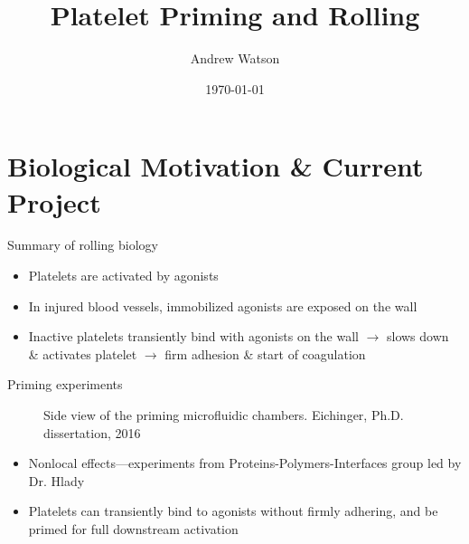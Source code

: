 \documentclass[10pt]{beamer}
\title{Platelet Priming and Rolling}
\date{\today}
\author{Andrew Watson}
\institute{University of Utah}
\begin{document}
\maketitle


\section{Biological Motivation \& Current Project}

\begin{frame}{Summary of rolling biology}
  \begin{itemize}
  \item Platelets are activated by agonists
  \item In injured blood vessels, immobilized agonists are exposed on
    the wall
  \item Inactive platelets transiently bind with agonists on the wall
    $\rightarrow$ slows down \& activates platelet $\rightarrow$ firm
    adhesion \& start of coagulation
  \end{itemize}
\end{frame}

\begin{frame}{Priming experiments}
  \begin{figure}
    \centering
    \setlength{\fboxsep}{0pt}
    \setlength{\fboxrule}{.25pt}
    \caption{Side view of the priming microfluidic
      chambers. Eichinger, Ph.D. dissertation, 2016}
    \label{fig:flow-chambers}
  \end{figure}

  \begin{itemize}
  \item Nonlocal effects---experiments from
    Proteins-Polymers-Interfaces group led by Dr. Hlady
  \item Platelets can transiently bind to agonists without firmly
    adhering, and be primed for full downstream activation
  \end{itemize}
\end{frame}
\end{document}
